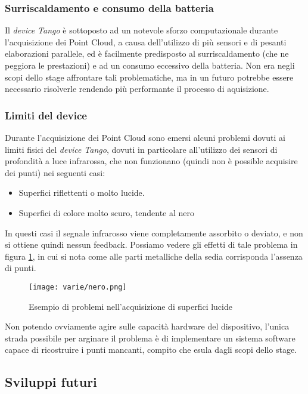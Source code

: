 \subsubsection{Surriscaldamento e consumo della batteria}
Il \emph{device Tango} è sottoposto ad un notevole sforzo computazionale durante l'acquisizione dei Point Cloud, a causa dell'utilizzo di più sensori e di pesanti elaborazioni parallele, ed è facilmente predisposto al surriscaldamento (che ne peggiora le prestazioni) e ad un consumo eccessivo della batteria. Non era negli scopi dello stage affrontare tali problematiche, ma in un futuro potrebbe essere necessario risolverle rendendo più performante il processo di aquisizione.

\subsubsection{Limiti del device}
Durante l'acquisizione dei Point Cloud sono emersi alcuni problemi dovuti ai limiti fisici del \emph{device Tango}, dovuti in particolare all'utilizzo dei sensori di profondità a luce infrarossa, che non funzionano (quindi non è possible acquisire dei punti) nei seguenti casi:
\begin{itemize}
\item Superfici riflettenti o molto lucide.
\item Superfici di colore molto scuro, tendente al nero
\end{itemize}
In questi casi il segnale infrarosso viene completamente assorbito o deviato, e non si ottiene quindi nessun feedback. Possiamo vedere gli effetti di tale problema in figura \ref{fig:nero}, in cui si nota come alle parti metalliche della sedia corrisponda l'assenza di punti.
\begin{figure}[!h] 
    \centering 
    \texttt{[image: varie/nero.png]} 
    \caption{Esempio di problemi nell'acquisizione di superfici lucide}
   \label{fig:nero}
\end{figure}
\newline
Non potendo ovviamente agire sulle capacità hardware del dispositivo, l'unica strada possibile per arginare il problema è di implementare un sistema software capace di ricostruire i punti mancanti, compito che esula dagli scopi dello stage.

\subsection{Sviluppi futuri}
